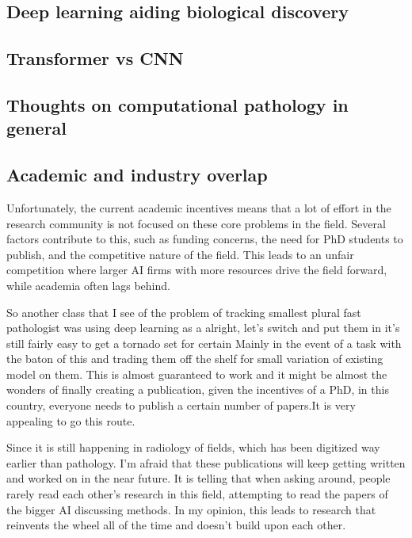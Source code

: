 \documentclass[
  12pt,
  a5,margin=2cmpaper,
]{article}
\begin{document}
\hypertarget{deep-learning-aiding-biological-discovery}{%
\subsection{Deep learning aiding biological
discovery}\label{deep-learning-aiding-biological-discovery}}

\hypertarget{transformer-vs-cnn}{%
\subsection{Transformer vs CNN}\label{transformer-vs-cnn}}

\hypertarget{thoughts-on-computational-pathology-in-general}{%
\subsection{Thoughts on computational pathology in
general}\label{thoughts-on-computational-pathology-in-general}}

\hypertarget{academic-and-industry-overlap}{%
\subsection{Academic and industry
overlap}\label{academic-and-industry-overlap}}

Unfortunately, the current academic incentives means that a lot of
effort in the research community is not focused on these core problems
in the field. Several factors contribute to this, such as funding
concerns, the need for PhD students to publish, and the competitive
nature of the field. This leads to an unfair competition where larger AI
firms with more resources drive the field forward, while academia often
lags behind.

So another class that I see of the problem of tracking smallest plural
fast pathologist was using deep learning as a alright, let's switch and
put them in it's still fairly easy to get a tornado set for certain
Mainly in the event of a task with the baton of this and trading them
off the shelf for small variation of existing model on them. This is
almost guaranteed to work and it might be almost the wonders of finally
creating a publication, given the incentives of a PhD, in this country,
everyone needs to publish a certain number of papers.It is very
appealing to go this route.

Since it is still happening in radiology of fields, which has been
digitized way earlier than pathology. I'm afraid that these publications
will keep getting written and worked on in the near future. It is
telling that when asking around, people rarely read each other's
research in this field, attempting to read the papers of the bigger AI
discussing methods. In my opinion, this leads to research that reinvents
the wheel all of the time and doesn't build upon each other.
\end{document}
